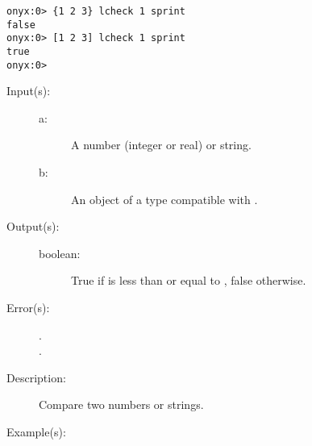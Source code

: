 \begin{description}
\begin{description}
\begin{verbatim}
onyx:0> {1 2 3} lcheck 1 sprint
false
onyx:0> [1 2 3] lcheck 1 sprint
true
onyx:0>
		\end{verbatim}
	\end{description}
\label{systemdict:le}
\item[{\onyxop{a b}{le}{boolean}}: ]
	\begin{description}\item[]
	\item[Input(s): ]
		\begin{description}\item[]
		\item[a: ]
			A number (integer or real) or string.
		\item[b: ]
			An object of a type compatible with .
		\end{description}
	\item[Output(s): ]
		\begin{description}\item[]
		\item[boolean: ]
			True if  is less than or equal to ,
			false otherwise.
		\end{description}
	\item[Error(s): ]
		\begin{description}\item[]
		\item[.]
		\item[.]
		\end{description}
	\item[Description: ]
		Compare two numbers or strings.
	\item[Example(s): ]\begin{verbatim}


\end{verbatim}
\end{description}
\end{description}
